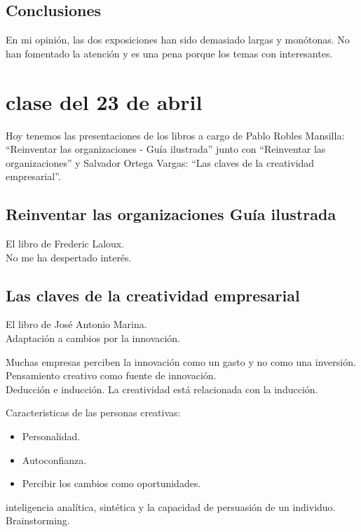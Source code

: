 \documentclass[12pt, a4paper, twoside]{article}
\begin{document}
\subsection{Conclusiones}

En mi opinión, las dos exposiciones han sido demasiado largas y monótonas.
No han fomentado la atención y es una pena porque los temas con interesantes.



\section{clase del 23 de abril}

Hoy tenemos las presentaciones de los libros a cargo de Pablo Robles Mansilla: ``Reinventar las organizaciones - Guía ilustrada'' junto con ``Reinventar las
organizaciones'' y Salvador Ortega Vargas: ``Las claves de la creatividad
empresarial''.

\subsection{Reinventar las organizaciones \- Guía ilustrada}
El libro de Frederic Laloux.\\

No me ha despertado interés. 
\subsection{Las claves de la creatividad empresarial}
El libro de José Antonio Marina.\\
Adaptación a cambios por la innovación.

Muchas empresas perciben la innovación como un gasto y no como una inversión.\\
Pensamiento creativo como fuente de innovación.\\
Deducción e inducción. La creatividad está relacionada con la inducción.

Caracteristicas de las personas creativas:
\begin{itemize}
    \item Personalidad.
    \item Autoconfianza.
    \item Percibir los cambios como oportunidades.
\end{itemize}
inteligencia analítica, sintética y la capacidad de persuasión de un individuo.\\

Brainstorming.
\end{document}
